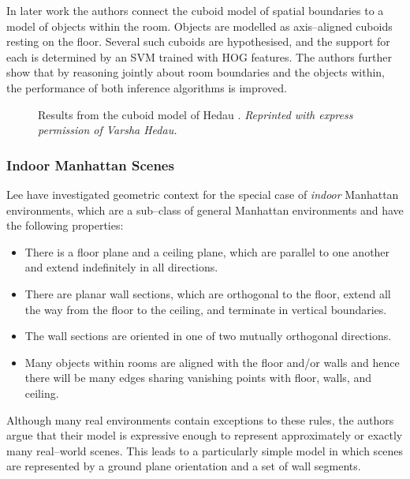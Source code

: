 In later work \cite{Hedau2010} the authors connect the cuboid model of
spatial boundaries to a model of objects within the room. Objects are
modelled as axis--aligned cuboids resting on the floor. Several such
cuboids are hypothesised, and the support for each is determined by an
SVM trained with HOG features. The authors further show that by
reasoning jointly about room boundaries and the objects within, the
performance of both inference algorithms is improved.

\begin{figure}[tb]
  \centering
  \caption{Results from the cuboid model of Hedau \etal
    \cite{Hedau2009,Hedau2010}.
    \textit{Reprinted with express permission of Varsha Hedau.}
  }
  \label{fig:hedau-result}
\end{figure}

\subsubsection{Indoor Manhattan Scenes}

Lee \etal \cite{Lee09} have investigated geometric context for the
special case of \textit{indoor} Manhattan environments, which are a
sub--class of general Manhattan environments and have the following
properties:
\begin{itemize}
  \item{There is a floor plane and a ceiling plane, which are parallel
    to one another and extend indefinitely in all directions.}
  \item{There are planar wall sections, which are orthogonal to the
    floor, extend all the way from the floor to the ceiling, and
    terminate in vertical boundaries.}
  \item{The wall sections are oriented in one of two mutually
    orthogonal directions.}
  \item{Many objects within rooms are aligned with the floor and/or
    walls and hence there will be many edges sharing vanishing points
    with floor, walls, and ceiling.}
\end{itemize}

Although many real environments contain exceptions to these rules, the
authors argue that their model is expressive enough to represent
approximately or exactly many real--world scenes. This leads to a
particularly simple model in which scenes are represented by a ground
plane orientation and a set of wall segments.

